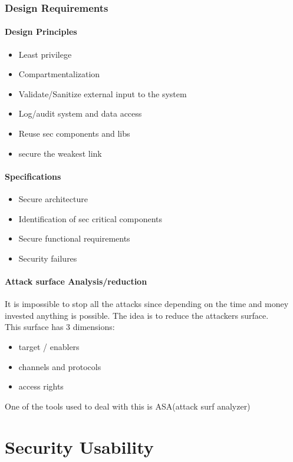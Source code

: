 \documentclass[10pt,a4paper]{article}
\begin{document}
\begin{itemize}
\subsubsection{Design Requirements}
\paragraph{Design Principles}
\begin{itemize}
\item Least privilege
\item Compartmentalization
\item Validate/Sanitize external input to the system 
\item Log/audit system and data access
\item Reuse sec components and libs
\item secure the weakest link
\end{itemize}
\paragraph{Specifications}
\begin{itemize}
\item Secure architecture
\item Identification of sec critical components
\item Secure functional requirements
\item Security failures
\end{itemize}
\paragraph{Attack surface Analysis/reduction}
It is impossible to stop all the attacks since depending on the time and money invested anything is possible. The idea is to reduce the attackers surface.\\
This surface has 3 dimensions:
\begin{itemize}
\item target / enablers
\item channels and protocols
\item access rights
\end{itemize}
One of the tools used to deal with this is ASA(attack surf analyzer)
\end{itemize}
\section{Security Usability}
\end{document}
